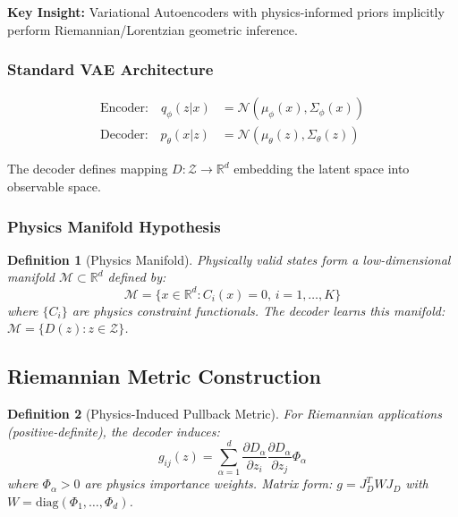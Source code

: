 \documentclass[11pt,a4paper]{article}
\newtheorem{definition}{Definition}
\begin{document}
\textbf{Key Insight:} Variational Autoencoders with physics-informed priors implicitly perform Riemannian/Lorentzian geometric inference.

\subsubsection{Standard VAE Architecture}

\begin{align}
\text{Encoder:} \quad q_\phi(z|x) &= \mathcal{N}(\mu_\phi(x), \Sigma_\phi(x)) \\
\text{Decoder:} \quad p_\theta(x|z) &= \mathcal{N}(\mu_\theta(z), \Sigma_\theta(z))
\end{align}

The decoder defines mapping $D: \mathcal{Z} \to \mathbb{R}^d$ embedding the latent space into observable space.

\subsubsection{Physics Manifold Hypothesis}

\begin{definition}[Physics Manifold]
Physically valid states form a low-dimensional manifold $\mathcal{M} \subset \mathbb{R}^d$ defined by:
\begin{equation}
\mathcal{M} = \{x \in \mathbb{R}^d : C_i(x) = 0, \, i=1,\ldots,K\}
\end{equation}
where $\{C_i\}$ are physics constraint functionals. The decoder learns this manifold: $\mathcal{M} = \{D(z) : z \in \mathcal{Z}\}$.
\end{definition}

\subsection{Riemannian Metric Construction}

\begin{definition}[Physics-Induced Pullback Metric]
For Riemannian applications (positive-definite), the decoder induces:
\begin{equation}
g_{ij}(z) = \sum_{\alpha=1}^d \frac{\partial D_\alpha}{\partial z_i}\frac{\partial D_\alpha}{\partial z_j} \Phi_\alpha
\end{equation}
where $\Phi_\alpha > 0$ are physics importance weights. Matrix form: $g = J_D^T W J_D$ with $W = \text{diag}(\Phi_1,\ldots,\Phi_d)$.
\end{definition}
\end{document}
